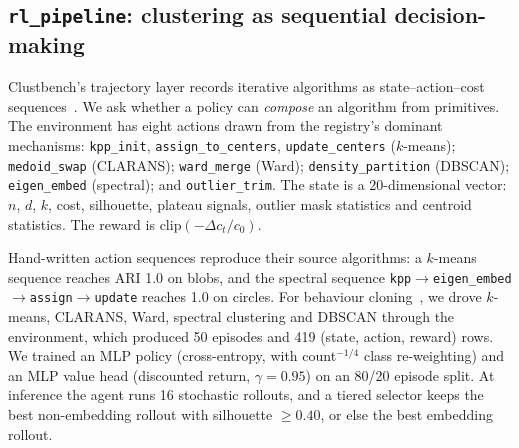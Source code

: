 \documentclass[11pt,a4paper]{article}
\newcommand{\code}[1]{\texttt{#1}}
\begin{document}
\subsection{\texorpdfstring{\code{rl\_pipeline}}{rl\_pipeline}: clustering as sequential decision-making}\label{sec:rl}
Clustbench's trajectory layer records iterative algorithms as
state--action--cost sequences~\cite{clustbenchharness}. We ask whether a
policy can \emph{compose} an algorithm from primitives. The environment has
eight actions drawn from the registry's dominant mechanisms:
\code{kpp\_init}, \code{assign\_to\_centers}, \code{update\_centers}
($k$-means); \code{medoid\_swap} (CLARANS); \code{ward\_merge} (Ward);
\code{density\_partition} (DBSCAN); \code{eigen\_embed} (spectral); and
\code{outlier\_trim}. The state is a 20-dimensional vector: $n$, $d$, $k$,
cost, silhouette, plateau signals, outlier mask statistics and centroid
statistics. The reward is $\mathrm{clip}(-\Delta c_t / c_0)$.

Hand-written action sequences reproduce their source algorithms: a $k$-means
sequence reaches ARI 1.0 on blobs, and the spectral sequence
\code{kpp}$\to$\code{eigen\_embed}$\to$\code{assign}$\to$\code{update} reaches
1.0 on circles. For behaviour cloning~\cite{pomerleau1989alvinn}, we drove
$k$-means, CLARANS, Ward, spectral clustering and DBSCAN through the
environment, which produced 50 episodes and 419 (state, action, reward) rows.
We trained an MLP policy (cross-entropy, with count$^{-1/4}$ class
re-weighting) and an MLP value head (discounted return, $\gamma{=}0.95$) on an
80/20 episode split. At inference the agent runs 16 stochastic rollouts, and a
tiered selector keeps the best non-embedding rollout with silhouette $\ge
0.40$, or else the best embedding rollout.
\end{document}
